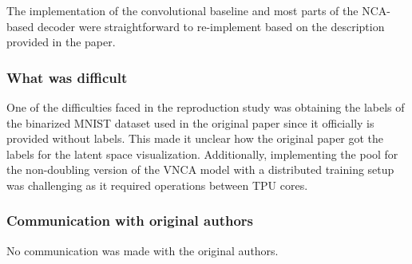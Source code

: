 The implementation of the convolutional baseline and most parts of the NCA-based decoder were straightforward to re-implement based on the description provided in the paper.


\subsubsection*{What was difficult}

One of the difficulties faced in the reproduction study was obtaining the labels of the binarized MNIST dataset used in the original paper since it officially is provided without labels. This made it unclear how the original paper got the labels for the latent space visualization. 
Additionally, implementing the pool for the non-doubling version of the VNCA model with a distributed training setup was challenging as it required operations between TPU cores. %

\subsubsection*{Communication with original authors}


No communication was made with the original authors.